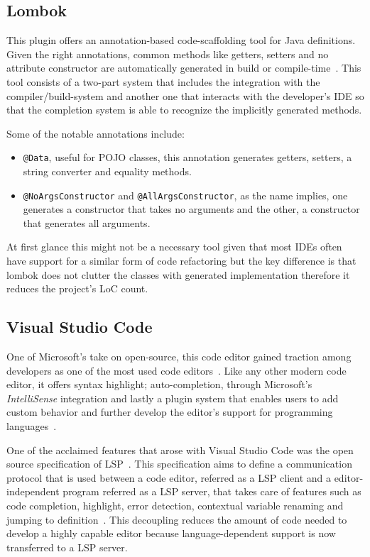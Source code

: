 \subsection{Lombok}\label{tech:lombok}
This plugin offers an annotation-based code-scaffolding tool for Java definitions. Given the right annotations, common methods like getters, setters and no attribute constructor are automatically generated in build or compile-time~\cite{lombok}. This tool consists of a two-part system that includes the integration with the compiler/build-system and another one that interacts with the developer's \gls{IDE} so that the completion system is able to recognize the implicitly generated methods.

Some of the notable annotations include:

\begin{itemize}
\item \texttt{@Data}, useful for \gls{POJO} classes, this annotation generates getters, setters, a string converter and equality methods.
\item \texttt{@NoArgsConstructor} and \texttt{@AllArgsConstructor}, as the name implies, one generates a constructor that takes no arguments and the other, a constructor that generates all arguments.
\end{itemize}

At first glance this might not be a necessary tool given that most \gls{IDE}s often have support for a similar form of code refactoring but the key difference is that lombok does not clutter the classes with generated implementation therefore it reduces the project's \gls{LoC} count.

\subsection{Visual Studio Code}
One of Microsoft's take on open-source, this code editor gained traction among developers as one of the most used code editors~\cite{vscodesurvey}. Like any other modern code editor, it offers syntax highlight; auto-completion, through Microsoft's \textit{IntelliSense} integration and lastly a plugin system that enables users to add custom behavior and further develop the editor's support for programming languages~\cite{vscode}.

One of the acclaimed features that arose with Visual Studio Code was the open source specification of \gls{LSP}~\cite{lsplaunch}. This specification aims to define a communication protocol that is used between a code editor, referred as a \gls{LSP} client and a editor-independent program referred as a \gls{LSP} server, that takes care of features such as code completion, highlight, error detection, contextual variable renaming and jumping to definition~\cite{lspspec}. This decoupling reduces the amount of code needed to develop a highly capable editor because language-dependent support is now transferred to a \gls{LSP} server.


